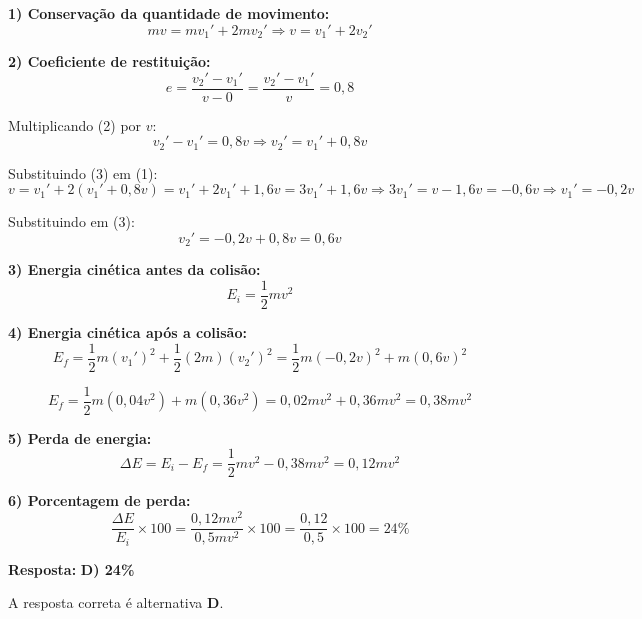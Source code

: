 \begin{flushleft}
\textbf{1) Conservação da quantidade de movimento:}
\[
mv = mv_1' + 2mv_2' \Rightarrow v = v_1' + 2v_2' \tag{1}
\]

\textbf{2) Coeficiente de restituição:}
\[
e = \frac{v_2' - v_1'}{v - 0} = \frac{v_2' - v_1'}{v} = 0{,}8 \tag{2}
\]

Multiplicando (2) por $v$:
\[
v_2' - v_1' = 0{,}8v \Rightarrow v_2' = v_1' + 0{,}8v \tag{3}
\]

Substituindo (3) em (1):
\[
v = v_1' + 2(v_1' + 0{,}8v) = v_1' + 2v_1' + 1{,}6v = 3v_1' + 1{,}6v
\Rightarrow 3v_1' = v - 1{,}6v = -0{,}6v
\Rightarrow v_1' = -0{,}2v
\]

Substituindo em (3):
\[
v_2' = -0{,}2v + 0{,}8v = 0{,}6v
\]

\textbf{3) Energia cinética antes da colisão:}
\[
E_i = \frac{1}{2}mv^2
\]

\textbf{4) Energia cinética após a colisão:}
\[
E_f = \frac{1}{2}m(v_1')^2 + \frac{1}{2}(2m)(v_2')^2 
= \frac{1}{2}m(-0{,}2v)^2 + m(0{,}6v)^2 
\]

\[
E_f = \frac{1}{2}m(0{,}04v^2) + m(0{,}36v^2) 
= 0{,}02mv^2 + 0{,}36mv^2 = 0{,}38mv^2
\]


\textbf{5) Perda de energia:}
\[
\Delta E = E_i - E_f = \frac{1}{2}mv^2 - 0{,}38mv^2 = 0{,}12mv^2
\]

\textbf{6) Porcentagem de perda:}
\[
\frac{\Delta E}{E_i} \times 100 = \frac{0{,}12mv^2}{0{,}5mv^2} \times 100 
= \frac{0{,}12}{0{,}5} \times 100 = 24\%
\]

\textbf{Resposta:} \textbf{D) 24\%}

A resposta correta é alternativa \colorbox{green!50}{\textbf{D}}.

\end{flushleft}

